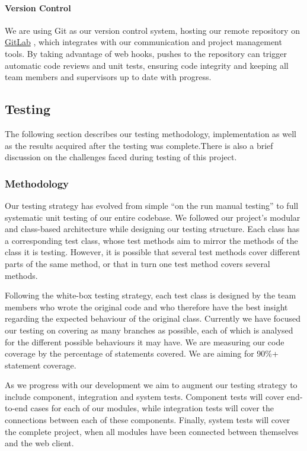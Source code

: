 \documentclass[a4paper,11pt]{article}
\begin{document}
\paragraph{Version Control}
We are using Git as our version control system, hosting our remote repository on \href{http://gitlab.com}{GitLab} \cite{gitlab}, which integrates with our communication and project management tools. By taking advantage of web hooks, pushes to the repository can trigger automatic code reviews and unit tests, ensuring code integrity and keeping all team members and supervisors up to date with progress.

\subsection{Testing}
The following section describes our testing methodology, implementation as well as the results acquired after the testing was complete.There is also a brief discussion on the challenges faced during testing of this project.

\subsubsection{Methodology}
Our testing strategy has evolved from simple ``on the run manual testing'' to full systematic unit testing of our entire codebase. We followed our project's modular and class-based architecture while designing our testing structure. Each class has a corresponding test class, whose test methods aim to mirror the methods of the class it is testing. However, it is possible that several test methods cover different parts of the same method, or that in turn one test method covers several methods.

Following the white-box testing strategy, each test class is designed by the team members who wrote the original code and who therefore have the best insight regarding the expected behaviour of the original class. Currently we have focused our testing on covering as many branches as possible, each of which is analysed for the different possible behaviours it may have. We are measuring our code coverage by the percentage of statements covered. We are aiming for 90\%+ statement coverage.

As we progress with our development we aim to augment our testing strategy to include component, integration and system tests. Component tests will cover end-to-end cases for each of our modules, while integration tests will cover the connections between each of these components. Finally, system tests will cover the complete project, when all modules have been connected between themselves and the web client.
\end{document}

